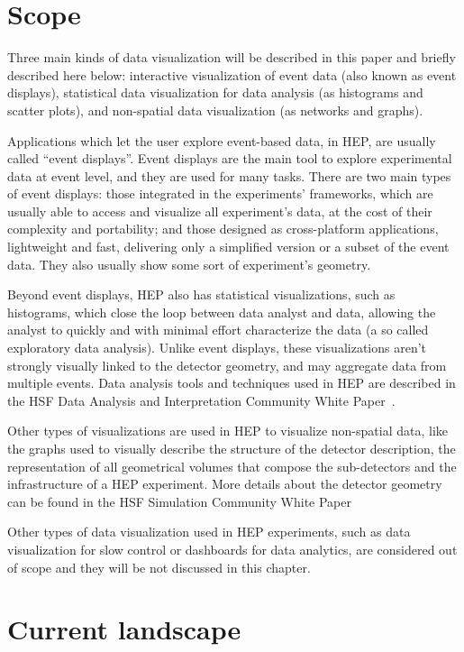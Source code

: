 \documentclass[12pt,a4paper]{article}
\begin{document}
\hypertarget{scope}{%
\section{Scope}\label{scope}}

Three main kinds of data visualization will be described in this paper and briefly described here below:
interactive visualization of event data (also known as event displays), statistical data visualization for
data analysis (as histograms and scatter plots), and non-spatial data visualization (as networks and graphs).

Applications which let the user explore event-based data, in HEP, are usually
called “event displays”. Event displays are the main tool to explore experimental data at event level,
and they are used for many tasks. There are two main types of event displays:
those integrated in the experiments’ frameworks, which are usually able to access and visualize
all experiment’s data, at the cost of their complexity and portability; and those designed as cross-platform
  applications, lightweight and fast, delivering only a simplified version or a subset of the event data.
  They also usually show some sort of experiment’s geometry.

Beyond event displays, HEP also has statistical visualizations,
such as histograms, which close the loop between data analyst and data, allowing the analyst to quickly
and with minimal effort characterize the data (a so called exploratory data analysis).
Unlike event displays, these visualizations aren’t strongly visually linked to the detector geometry,
and may aggregate data from multiple events. Data analysis tools and techniques used in HEP are
described in the HSF Data Analysis and Interpretation Community White Paper~\cite{DataAnalysisCWP2017}.

Other types of visualizations are used in HEP to
visualize non-spatial data, like the graphs used to visually describe the structure of the detector description,
the representation of all geometrical volumes that compose the sub-detectors and the infrastructure of a HEP experiment.
More details about the detector geometry can be found in the HSF Simulation Community White Paper~\cite{hsf-cwp-simulation}

Other types of data visualization used in HEP experiments, such as data visualization for slow control
or dashboards for data analytics, are considered out of scope and they will be not discussed in this chapter.

\hypertarget{current-landscape}{%
\section{Current landscape}\label{current-landscape}}
\end{document}
